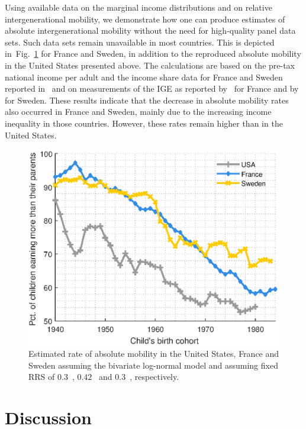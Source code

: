 \documentclass[12pt]{article}
\newcommand{\flabel}[1]{\label{fig:#1}}
\newcommand{\fref}[1]{Fig.~\ref{fig:#1}}
\numberwithin{equation}{section}
\begin{document}
Using available data on the marginal income distributions and on relative intergenerational mobility, we demonstrate how one can produce estimates of absolute intergenerational mobility without the need for high-quality panel data sets. Such data sets remain unavailable in most countries. This is depicted in~\fref{countries} for France and Sweden, in addition to the reproduced absolute mobility in the United States presented above. The calculations are based on the pre-tax national income per adult and the income share data for France and Sweden reported in~\citet{WID2017} and on measurements of the IGE as reported by~\citet{lefranc2005intergenerational} for France and by~\citet{bjorklund1997intergenerational} for Sweden. These results indicate that the decrease in absolute mobility rates also occurred in France and Sweden, mainly due to the increasing income inequality in those countries. However, these rates remain higher than in the United States.

\begin{figure}[!htb]
\centering
\includegraphics[width=1.0\textwidth] {./figs/countries0.eps}
\caption{Estimated rate of absolute mobility in the United States, France and Sweden assuming the bivariate log-normal model and assuming fixed RRS of $0.3$~\citep{chetty2014land}, $0.42$~\citep{lefranc2005intergenerational} and $0.3$~\citep{bjorklund1997intergenerational}, respectively.}
\flabel{countries}
\end{figure}

\section{Discussion}
\end{document}
